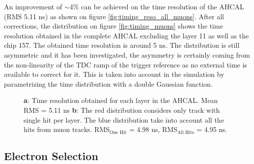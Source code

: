 \documentclass[twoside,a4paper,11pt]{article}
\begin{document}
An improvement of $\sim$4\% can be achieved on the time resolution of the AHCAL (RMS 5.11 ns) as shown on figure \ref{fig:timing_reso_all_muons}. After all corrections, the distribution on figure \ref{fig:timing_muons} shows the time resolution obtained in the complete AHCAL excluding the layer 11 as well as the chip 157. The obtained time resolution is around 5 ns. The distribution is still asymmetric and it has been investigated, the asymmetry is certainly coming from the non-linearity of the TDC ramp of the trigger reference as no external time is available to correct for it. This is taken into account in the simulation by parametrizing the time distribution with a double Gaussian function.
\begin{figure}[htbp]
	\hfill
	\caption[]{\textbf{a}: Time resolution obtained for each layer in the AHCAL. Mean RMS = 5.11 ns \textbf{b}: The red distribution considers only track with single hit per layer. The blue distribution take into account all the hits from muon tracks. RMS$_{\text{One Hit}}$ = 4.98 ns, RMS$_{\text{All Hits}}$ = 4.95 ns.}
\end{figure}

\subsection{Electron Selection}
\label{subsec:elec_sel}
\end{document}
